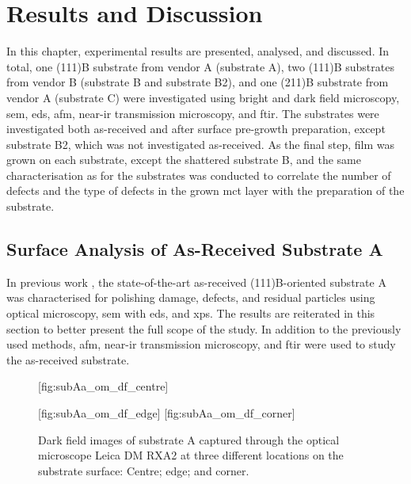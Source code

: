\chapter{Results and Discussion}\label{ch:results-and-discussion}
In this chapter, experimental results are presented, analysed, and discussed. In total, one (111)B substrate from vendor A (substrate A), two (111)B substrates from vendor B (substrate B and substrate B2), and one (211)B substrate from vendor A (substrate C) were investigated using bright and dark field microscopy, \ac{sem}, \ac{eds}, \ac{afm}, near-\ac{ir} transmission microscopy, and \ac{ftir}. The substrates were investigated both as-received and after surface pre-growth preparation, except substrate B2, which was not investigated as-received. As the final step,  film was grown on each substrate, except the shattered substrate B, and the same characterisation as for the substrates was conducted to correlate the number of defects and the type of defects in the grown \ac{mct} layer with the preparation of the substrate.
\section{Surface Analysis of As-Received Substrate A}\label{sec:subAa}
In previous work \citep{lauten2017characterisation}, the state-of-the-art as-received (111)B-oriented substrate A was characterised for polishing damage, defects, and residual particles using optical microscopy, \ac{sem} with \ac{eds}, and \ac{xps}. The results are reiterated in this section to better present the full scope of the study. In addition to the previously used methods, \ac{afm}, near-\ac{ir} transmission microscopy, and \ac{ftir} were used to study the as-received substrate.

\begin{figure}[htbp]
    \centering
    [fig:subAa_om_df_centre]
    \par\bigskip
    [fig:subAa_om_df_edge]
    \hfill
    [fig:subAa_om_df_corner]
    \caption[Dark field images of substrate A.]{Dark field images of substrate A captured through the optical microscope Leica DM RXA2 at three different locations on the substrate surface:  Centre;  edge; and  corner.}
    \label{fig:subAa_om_df}
\end{figure}

